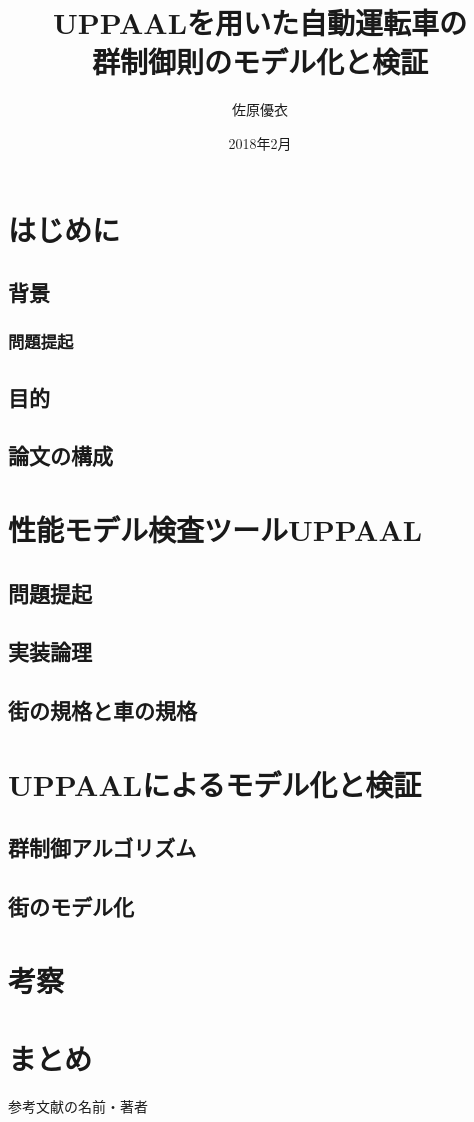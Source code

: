 \documentclass{tpu-sotu}
\title{UPPAALを用いた自動運転車の\\群制御則のモデル化と検証}
\author{佐原優衣}
\date{2018年2月}
\begin{document}
\maketitle
\clearpage
{}
\setcounter{tocdepth}{3}
\tableofcontents
\clearpage
{}

\chapter{はじめに}
	\section{背景}
		\subsection{問題提起}
	\section{目的}
	\section{論文の構成}
\chapter{性能モデル検査ツールUPPAAL}
	\section{問題提起}
	\section{実装論理}
	\section{街の規格と車の規格}
\chapter{UPPAALによるモデル化と検証}
	\section{群制御アルゴリズム}
	\section{街のモデル化}
\chapter{考察}
\chapter{まとめ}
\acknowledgements
\begin{thebibliography}{数字}
	 参考文献の名前・著者
\end{thebibliography}
\end{document}
